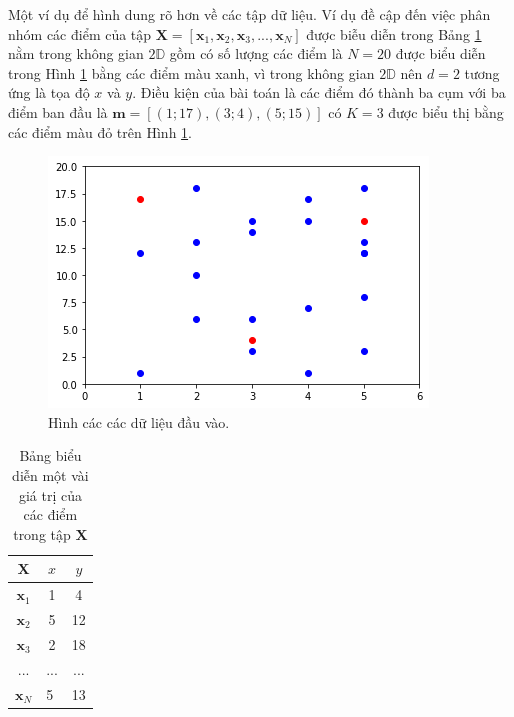 \documentclass{article}
\begin{document}
	Một ví dụ để hình dung rõ hơn về các tập dữ liệu. Ví dụ đề cập đến việc phân nhóm các điểm của tập $\mathbf{X} = [\mathbf{x}_1,\mathbf{x}_2,\mathbf{x}_3,...,\mathbf{x}_N]$ được biễu diễn trong Bảng \ref{tab:tbexample} nằm trong  không gian $2\mathds{D}$ gồm có số lượng các điểm là $N = 20$ được biểu diễn trong Hình \ref{fig:example1} bằng các điểm màu xanh, vì trong không gian $2\mathds{D}$ nên $d = 2$ tương ứng là tọa độ $x$ và $y$. Điều kiện của bài toán là các điểm đó thành ba cụm với ba điểm ban đầu là $\mathbf{m} = [(1;17),(3;4),(5;15)]$ có $K = 3$ được biểu thị bằng các điểm màu đỏ trên Hình \ref{fig:example1}.	
	\begin{figure}[h]
		\centering
		\includegraphics[width=0.5\linewidth]{img/img_example}
		\caption{Hình các các dữ liệu đầu vào.}
		\label{fig:example1}
	\end{figure}
	\begin{table}[h]
		\centering
		\begin{tabular}{|c|c|c|}
			\hline
			$\mathbf{X}$                       & $x$                      & $y$                       \\ \hline
			$\mathbf{x}_1$                       & 1                      & 4                       \\ \hline
			$\mathbf{x}_2$                       & 5                      & 12                      \\ \hline
			$\mathbf{x}_3$                       & 2                      & 18                      \\ \hline
			...                       & ...                      & ...                      \\ \hline
			\multicolumn{1}{|l|}{$\mathbf{x}_N$}   & \multicolumn{1}{l|}{5} & \multicolumn{1}{l|}{13} \\ \hline
		\end{tabular}
		\caption{Bảng biểu diễn một vài giá trị của các điểm trong tập $\mathbf{X}$}
		\label{tab:tbexample}
	\end{table}
\end{document}
